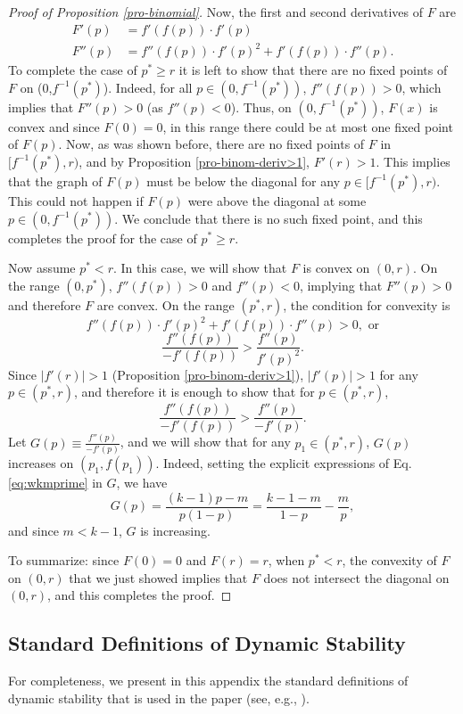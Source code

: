 \documentclass[12pt]{article}
\numberwithin{equation}{section}
\numberwithin{figure}{section}
\theoremstyle{definition}
\theoremstyle{plain}
\theoremstyle{plain}
\theoremstyle{plain}
\theoremstyle{remark}
\theoremstyle{plain}
\theoremstyle{plain}
\begin{document}
\begin{proof}[Proof of Proposition \ref{pro-binomial}]
Now, the first and second derivatives of $F$ are
\begin{align*}
    F'(p) &=f'(f(p))\cdot f'(p)\\
    F''(p)&=f''(f(p))\cdot f'(p)^2+f'(f(p))\cdot f''(p).
\end{align*}
To complete the case of $p^*\geq r$ it is left to show that there are no fixed points of $F$ on (0,$f^{-1}(p^*)$). Indeed, for all $p\in (0,f^{-1}(p^*))$, $f''(f(p))>0$, 
which implies that $F''(p)>0$ (as $f''(p)<0$). Thus, on $(0,f^{-1}(p^*))$, $F(x)$ is convex and since $F(0)=0$, in this range there could be at most one fixed point of $F(p)$. Now, as was shown before, there are no fixed points of $F$ in  $[f^{-1}(p^*),r)$, and by Proposition \eqref{pro-binom-deriv>1}, $F'(r)>1$. This implies that the graph of $F(p)$ must be below the diagonal for any $p\in [f^{-1}(p^*),r)$. This could not happen if $F(p)$ were above the diagonal at some $p\in (0,f^{-1}(p^*))$.
We conclude that there is no such fixed point, and this completes the proof for the case of $p^*\geq r$.

Now assume $p^*<r.$ In this case, we will show that $F$ is convex on $(0,r)$. On the range $(0,p^*)$, $f''(f(p))>0$ and $f''(p)<0$, implying that $F''(p)>0$ and therefore $F$ are convex. On the range $(p^*,r)$, the condition for convexity is 
$$f''(f(p))\cdot f'(p)^2+f'(f(p))\cdot f''(p)>0, \textrm{ or}$$
$$\frac {f''(f(p))}{-f'(f(p))}>\frac {f''(p)}{f'(p)^2}.$$
Since $|f'(r)|>1$ (Proposition \ref{pro-binom-deriv>1}), $|f'(p)|>1$ for any $p\in(p^*,r)$, and therefore it is enough to show that for $p\in(p^*,r)$, 
$$\frac {f''(f(p))}{-f'(f(p))}>\frac {f''(p)}{-f'(p)}.$$
Let $G(p)\equiv \frac {f''(p)}{-f'(p)}$, and we will show that for any $p_1\in(p^*,r)$, $G(p)$ increases on $(p_1,f(p_1))$. Indeed, setting the explicit expressions of Eq. \eqref{eq:wkmprime} in $G$, we have  
$$G(p)=\frac{(k-1)p-m}{p(1-p)}=\frac{k-1-m}{1-p}-\frac{m}{p},$$
and since $m<k-1$, $G$ is increasing.

To summarize: since $F(0)=0$ and $F(r)=r$, when $p^*<r$, the convexity of $F$ on $(0,r)$ that we just showed implies that $F$ does not intersect the diagonal on $(0,r)$, and this completes the proof. 

\end{proof}
\subsection{Standard Definitions of Dynamic Stability}\label{sub-standard-definitions}
For completeness, we present in this appendix  the standard definitions of dynamic stability that is used in the paper (see, e.g., \citealp[Chapter 5]{weibull1997evolutionary}).
\end{document}
